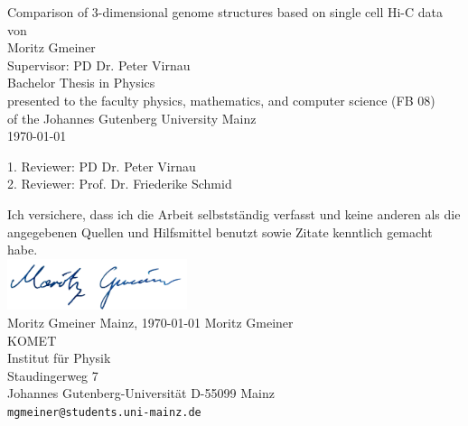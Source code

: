 \documentclass[a4paper,11pt,oneside,final,english,toc=bib]{scrbook}
\begin{document}

\begin{titlepage}
  \vspace*{6mm}
  \begin{center}
     {\afont Comparison of 3-dimensional genome structures based on single cell Hi-C data}
     \\[3.5cm]
     {\large von}
     \\[3.5cm]
     {\dfont Moritz Gmeiner}
     \\[1.5cm]
     {\dfont Supervisor: PD Dr. Peter Virnau}
     \\[2cm]
     {\large Bachelor Thesis in Physics \/\\
        presented to the faculty physics, mathematics, and computer science (FB 08) \/\\
        of the Johannes Gutenberg University Mainz \/\\
        \today}
   \end{center}
   \vfill
   1. Reviewer: PD Dr. Peter Virnau \\	
   2. Reviewer: Prof. Dr. Friederike Schmid \\
   \vfill
\end{titlepage}

\thispagestyle{empty}
Ich versichere, dass ich die Arbeit selbstständig verfasst und keine 
anderen als die angegebenen Quellen und Hilfsmittel benutzt sowie 
Zitate kenntlich gemacht habe.
\\[1cm]
\includegraphics[height=1.5cm]{Unterschrift.png} \\
Moritz Gmeiner \hfill Mainz, \today
\vfill
\noindent 
Moritz Gmeiner\\
KOMET\\
Institut für Physik\\
Staudingerweg 7\\
Johannes Gutenberg-Universität
D-55099 Mainz\\
{ \texttt{mgmeiner@students.uni-mainz.de} }
\end{document}
